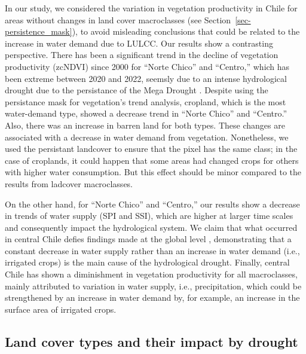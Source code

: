 \documentclass[
  number,
  preprint,
  3p,
  onecolumn]{elsarticle}
\begin{document}
In our study, we considered the variation in vegetation productivity in
Chile for areas without changes in land cover macroclasses (see
Section~\ref{sec-persistence_mask}), to avoid misleading conclusions
that could be related to the increase in water demand due to LULCC. Our
results show a contrasting perspective. There has been a significant
trend in the decline of vegetation productivity (zcNDVI) since 2000 for
``Norte Chico'' and ``Centro,'' which has been extreme between 2020 and
2022, seemsly due to an intense hydrological drought due to the
persistance of the Mega Drought \citep{Garreaud2017}. Despite using the
persistance mask for vegetation's trend analysis, cropland, which is the
most water-demand type, showed a decrease trend in ``Norte Chico'' and
``Centro.'' Also, there was an increase in barren land for both types.
These changes are associated with a decrease in water demand from
vegetation. Nonetheless, we used the persistant landcover to ensure that
the pixel has the same class; in the case of croplands, it could happen
that some areas had changed crops for others with higher water
consumption. But this effect should be minor compared to the results
from ladcover macroclasses.

On the other hand, for ``Norte Chico'' and ``Centro,'' our results show
a decrease in trends of water supply (SPI and SSI), which are higher at
larger time scales and consequently impact the hydrological system. We
claim that what occurred in central Chile defies findings made at the
global level \citep{Vicente-Serrano2021, Kogan2020}, demonstrating that
a constant decrease in water supply rather than an increase in water
demand (i.e., irrigated crops) is the main cause of the hydrological
drought. Finally, central Chile has shown a diminishment in vegetation
productivity for all macroclasses, mainly attributed to variation in
water supply, i.e., precipitation, which could be strengthened by an
increase in water demand by, for example, an increase in the surface
area of irrigated crops.

\hypertarget{land-cover-types-and-their-impact-by-drought}{%
\subsection{Land cover types and their impact by
drought}\label{land-cover-types-and-their-impact-by-drought}}
\end{document}
